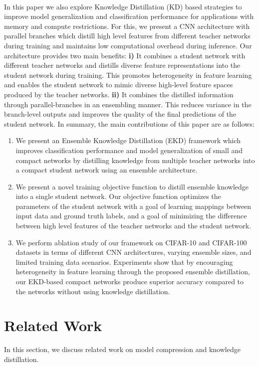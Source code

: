 \documentclass{ecai}
\begin{document}
\\
\indent
In this paper we also explore Knowledge Distillation (KD) based strategies to improve model generalization and classification performance for applications with memory and compute restrictions. For this, we present a CNN architecture with parallel branches which distill high level features from different teacher networks during training and maintains low computational overhead during inference.
Our architecture provides two main benefits: \textbf{i)} It combines a student network with different teacher networks and distills diverse feature representations into the student network during training. This promotes heterogeneity in feature learning and enables the student network to mimic diverse high-level feature spaces produced by the teacher networks. \textbf{ii)} It combines the distilled information through parallel-branches in an ensembling manner. This reduces variance in the branch-level outputs and improves the quality of the final predictions of the student network.
In summary, the main contributions of this paper are as follows:
\begin{enumerate}
\item
We present an Ensemble Knowledge Distillation (EKD) framework which improves classification performance and model generalization of small and compact networks by  distilling knowledge from multiple teacher networks into a compact student network using an ensemble architecture.
\item 
We present a novel training objective function to distill ensemble knowledge into a single student network. Our objective function optimizes the parameters of the student network with a goal of learning mappings between input data and ground truth labels, and a goal of minimizing the difference between high level features of the teacher networks and the student network.  
\item 
We perform ablation study of our framework on CIFAR-10 and CIFAR-100 datasets in terms of different CNN architectures, varying ensemble sizes, and limited training data scenarios. Experiments show that by encouraging heterogeneity in feature learning through the proposed ensemble distillation, our EKD-based compact networks produce superior accuracy compared to the networks without using knowledge distillation. 
\end{enumerate}
\section{Related Work}
In this section, we discuss related work on model compression and knowledge distillation.
\end{document}
